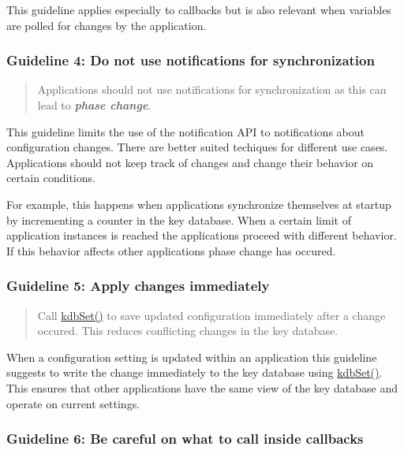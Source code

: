 This guideline applies especially to callbacks but is also relevant when variables are polled for changes by the application.

\subsubsection*{Guideline 4\+: Do not use notifications for synchronization}

\begin{quote}
Applications should not use notifications for synchronization as this can lead to {\itshape {\bfseries phase change}}. \end{quote}


This guideline limits the use of the notification A\+PI to notifications about configuration changes. There are better suited techiques for different use cases. Applications should not keep track of changes and change their behavior on certain conditions.

For example, this happens when applications synchronize themselves at startup by incrementing a counter in the key database. When a certain limit of application instances is reached the applications proceed with different behavior. If this behavior affects other applications phase change has occured.

\subsubsection*{Guideline 5\+: Apply changes immediately}

\begin{quote}
Call {\ttfamily \hyperlink{group__kdb_ga11436b058408f83d303ca5e996832bcf}{kdb\+Set()}} to save updated configuration immediately after a change occured. This reduces conflicting changes in the key database. \end{quote}


When a configuration setting is updated within an application this guideline suggests to write the change immediately to the key database using {\ttfamily \hyperlink{group__kdb_ga11436b058408f83d303ca5e996832bcf}{kdb\+Set()}}. This ensures that other applications have the same view of the key database and operate on current settings.

\subsubsection*{Guideline 6\+: Be careful on what to call inside callbacks}

